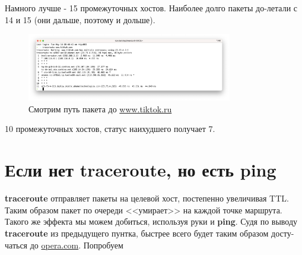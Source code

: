 \documentclass[a4paper]{article}
\begin{document}
  Намного лучше - 15 промежуточных хостов. Наиболее долго пакеты до-летали с 14 и 15 (они дальше, поэтому и дольше).
  
  \begin{figure}[H]
    \centering
    \includegraphics[width=0.8\textwidth]{s212}
    \caption{Смотрим путь пакета до \href{www.tiktok.ru}{www.tiktok.ru}}
  \end{figure}

  10 промежуточных хостов, статус наихудшего получает 7.

  \newpage
  \section{Если нет traceroute, но есть ping}

  \textbf{traceroute} отправляет пакеты на целевой хост, постепенно увеличивая TTL. Таким образом
  пакет по очереди <<умирает>> на каждой точке маршрута. Такого же эффекта мы можем добиться,
  используя руки и \textbf{ping}. Судя по выводу \textbf{traceroute} из предыдущего пунтка,
  быстрее всего будет таким образом досту-чаться до \href{opera.com}{opera.com}. Попробуем
\end{document}
